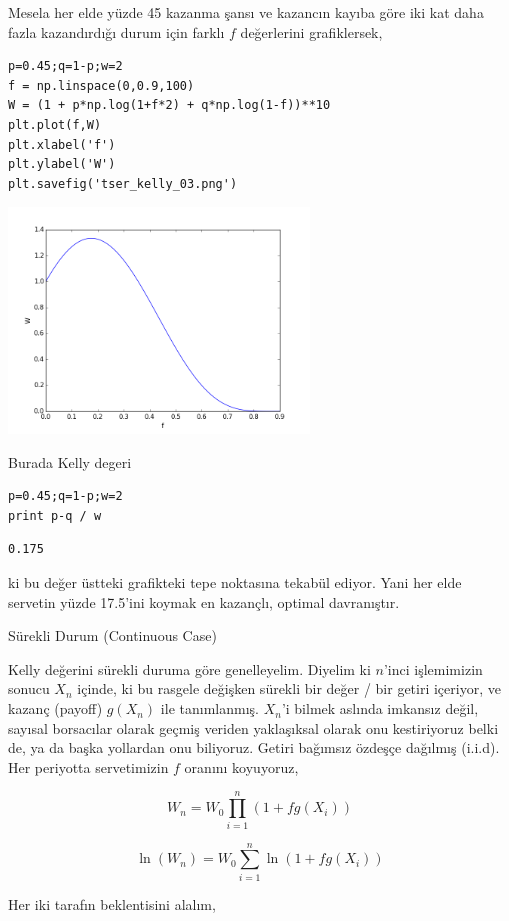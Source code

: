 \documentclass[12pt,fleqn]{article}\usepackage{../../common}
\begin{document}
Mesela her elde yüzde 45 kazanma şansı ve kazancın kayıba göre iki kat daha
fazla kazandırdığı durum için farklı $f$ değerlerini grafiklersek, 

\begin{verbatim}
p=0.45;q=1-p;w=2
f = np.linspace(0,0.9,100)
W = (1 + p*np.log(1+f*2) + q*np.log(1-f))**10
plt.plot(f,W)
plt.xlabel('f')
plt.ylabel('W')
plt.savefig('tser_kelly_03.png')
\end{verbatim}

\includegraphics[height=6cm]{tser_kelly_03.png}

Burada Kelly degeri 

\begin{verbatim}
p=0.45;q=1-p;w=2
print p-q / w
\end{verbatim}

\begin{verbatim}
0.175
\end{verbatim}

ki bu değer üstteki grafikteki tepe noktasına tekabül ediyor. Yani her elde
servetin yüzde 17.5'ini koymak en kazançlı, optimal davranıştır. 

Sürekli Durum (Continuous Case)

Kelly değerini sürekli duruma göre genelleyelim. Diyelim ki $n$'inci
işlemimizin sonucu $X_n$ içinde, ki bu rasgele değişken sürekli bir değer /
bir getiri içeriyor, ve kazanç (payoff) $g(X_n)$ ile tanımlanmış. $X_n$'i
bilmek aslında imkansız değil, sayısal borsacılar olarak geçmiş veriden
yaklaşıksal olarak onu kestiriyoruz belki de, ya da başka yollardan onu
biliyoruz. Getiri bağımsız özdeşçe dağılmış (i.i.d). Her periyotta
servetimizin $f$ oranını koyuyoruz,

$$ W_n = W_0 \prod_{i=1}^n (1+fg(X_i)) $$

$$ \ln(W_n) = W_0 \sum_{i=1}^n \ln (1+fg(X_i))  $$

Her iki tarafın beklentisini alalım,
\end{document}
